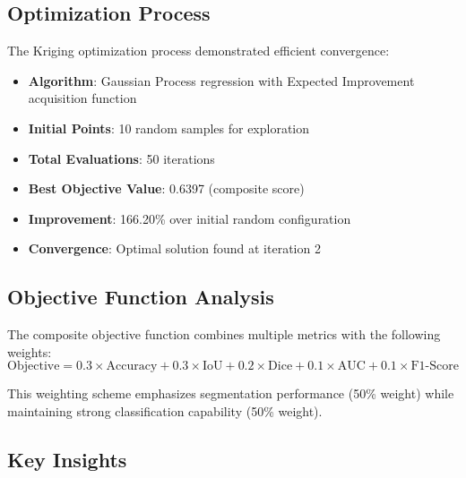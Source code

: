 \subsection{Optimization Process}

The Kriging optimization process demonstrated efficient convergence:

\begin{itemize}
\item \textbf{Algorithm}: Gaussian Process regression with Expected Improvement acquisition function
\item \textbf{Initial Points}: 10 random samples for exploration
\item \textbf{Total Evaluations}: 50 iterations
\item \textbf{Best Objective Value}: 0.6397 (composite score)
\item \textbf{Improvement}: 166.20\% over initial random configuration
\item \textbf{Convergence}: Optimal solution found at iteration 2
\end{itemize}

\subsection{Objective Function Analysis}

The composite objective function combines multiple metrics with the following weights:
\begin{equation}
\text{Objective} = 0.3 \times \text{Accuracy} + 0.3 \times \text{IoU} + 0.2 \times \text{Dice} + 0.1 \times \text{AUC} + 0.1 \times \text{F1-Score}
\end{equation}

This weighting scheme emphasizes segmentation performance (50\% weight) while maintaining strong classification capability (50\% weight).

\subsection{Key Insights}

